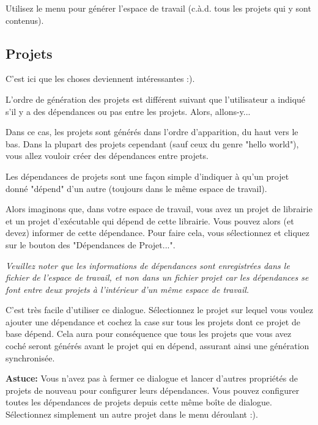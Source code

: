 Utilisez le menu  pour générer l'espace de travail (c.à.d. tous les projets qui y sont contenus). 

\subsection{Projets}

C'est ici que les choses deviennent intéressantes :).

L'ordre de génération des projets est différent suivant que l'utilisateur a indiqué s'il y a des dépendances ou pas entre les projets. Alors, allons-y...


Dans ce cas, les projets sont générés dans l'ordre d'apparition, du haut vers le bas. Dans la plupart des projets cependant (sauf ceux du genre "hello world"), vous allez vouloir créer des dépendances entre projets.


Les dépendances de projets sont une façon simple d'indiquer à \codeblocks qu'un projet donné "dépend" d'un autre (toujours dans le même espace de travail).

Alors imaginons que, dans votre espace de travail, vous avez un projet de librairie et un projet d'exécutable qui dépend de cette librairie. Vous pouvez alors (et devez) informer \codeblocks de cette dépendance. Pour faire cela, vous sélectionnez  et cliquez sur le bouton des  "Dépendances de Projet...".

\textit{Veuillez noter que les informations de dépendances sont enregistrées dans le fichier de l'espace de travail, et non dans un fichier projet car les dépendances se font entre deux projets à l'intérieur d'un même espace de travail.}


C'est très facile d'utiliser ce dialogue. Sélectionnez le projet sur lequel vous voulez ajouter une dépendance et cochez la case sur tous les projets dont ce projet de base dépend. Cela aura pour conséquence que tous les projets que vous avez coché seront générés avant le projet qui en dépend, assurant ainsi une génération synchronisée.

\textbf{Astuce:} Vous n'avez pas à fermer ce dialogue et lancer d'autres propriétés de projets de nouveau pour configurer leurs dépendances. Vous pouvez configurer toutes les dépendances de projets depuis cette même boîte de dialogue. Sélectionnez simplement un autre projet dans le menu déroulant :).

